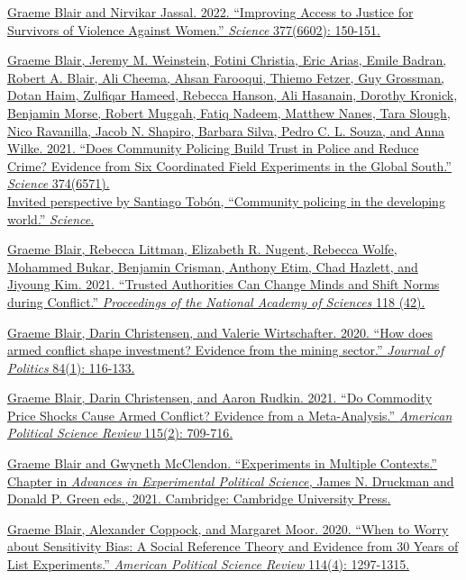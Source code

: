 \documentclass[10.9pt]{article}
\begin{document}
\begin{etaremune}
\item \href{https://graemeblair.com/papers/helpdesks.pdf}{Graeme Blair and Nirvikar Jassal. 2022. ``Improving Access to Justice for Survivors of Violence Against Women.'' {\it Science} 377(6602): 150-151.}
\item \href{https://www.science.org/doi/10.1126/science.abd3446}{Graeme Blair, Jeremy M. Weinstein, Fotini Christia, Eric Arias, Emile Badran, Robert A. Blair, Ali Cheema, Ahsan Farooqui, Thiemo Fetzer, Guy Grossman, Dotan Haim, Zulfiqar Hameed, Rebecca Hanson, Ali Hasanain, Dorothy Kronick, Benjamin Morse, Robert Muggah, Fatiq Nadeem, Matthew Nanes, Tara Slough, Nico Ravanilla, Jacob N. Shapiro, Barbara Silva, Pedro C. L. Souza, and Anna Wilke. 2021. ``Does Community Policing Build Trust in Police and Reduce Crime? Evidence from Six Coordinated Field Experiments in the Global South.'' {\it Science} 374(6571).} \\[0.35em]  \href{https://www.science.org/doi/10.1126/science.abm4112}{Invited perspective by Santiago Tob{\'o}n, ``Community policing in the developing world.'' {\it Science}.}
\item \href{https://www.pnas.org/content/pnas/118/42/e2105570118.full.pdf}{Graeme Blair, Rebecca Littman, Elizabeth R. Nugent, Rebecca Wolfe, Mohammed Bukar, Benjamin Crisman, Anthony Etim, Chad Hazlett, and Jiyoung Kim. 2021. ``Trusted Authorities Can Change Minds and Shift Norms during Conflict.'' {\it Proceedings of the National Academy of Sciences} 118 (42).}
\item \href{https://graemeblair.com/papers/prospecting.pdf}{Graeme Blair, Darin Christensen, and Valerie Wirtschafter. 2020. ``How does armed conflict shape investment? Evidence from the mining sector.'' {\it Journal of Politics} 84(1): 116-133.}
\item \href{https://graemeblair.com/papers/prices.pdf}{Graeme Blair, Darin Christensen, and Aaron Rudkin. 2021. ``Do Commodity Price Shocks Cause Armed Conflict? Evidence from a Meta-Analysis.'' {\it American Political Science Review} 115(2): 709-716.}
 \item \href{https://graemeblair.com/papers/contexts.pdf}{Graeme Blair and Gwyneth McClendon. ``Experiments in Multiple Contexts.'' Chapter in {\it Advances in Experimental Political Science,} James N. Druckman and Donald P. Green eds., 2021. Cambridge: Cambridge University Press.}
\item \href{https://graemeblair.com/papers/sensitivity.pdf}{Graeme Blair, Alexander Coppock, and Margaret Moor. 2020. ``When to Worry about Sensitivity Bias: A Social Reference Theory and Evidence from 30 Years of List Experiments.'' {\it American Political Science Review} 114(4): 1297-1315.}

\end{etaremune}
\end{document}
